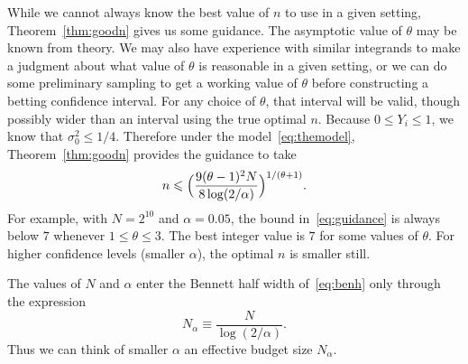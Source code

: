 \documentclass{article}
\newcommand{\art}[1]{\begingroup\color{blue}#1\endgroup}
\renewcommand{\le}{\leqslant}
\begin{document}
\art{While we cannot always know the best value of $n$ to use
in a given setting, Theorem~\ref{thm:goodn} gives us some guidance.
The asymptotic value of $\theta$ may be known from theory.
We may also have experience with similar integrands to make a
judgment about what value of $\theta$ is reasonable in a given
setting, or we can do some preliminary sampling to get a working
value of $\theta$ before constructing a betting confidence interval.
For any choice of $\theta$, that interval will be valid, though possibly 
wider than an interval using the true optimal $n$.
Because $0\le Y_i\le1$, we know that $\sigma_0^2\le 1/4$. Therefore
under the model~\eqref{eq:themodel}, Theorem~\ref{thm:goodn}
provides the guidance to take
\begin{align}\label{eq:guidance}
n\le \Bigl(\frac{9(\theta-1)^2N}{8\log(2/\alpha)}\Bigr)^{1/(\theta+1)}.
\end{align}
For example, with $N=2^{10}$ and $\alpha=0.05$, the bound in~\eqref{eq:guidance}
is always below $7$ whenever $1\le\theta\le3$. The best integer
value is $7$ for some values of $\theta$.
For higher confidence levels (smaller $\alpha$), the optimal
$n$ is smaller still.
}

\art{The values of $N$ and $\alpha$ enter the Bennett half width
of~\eqref{eq:benh} only through  the expression 
$$N_\alpha\equiv \frac{N}{\log(2/\alpha)}.$$ 
Thus
we can think of smaller $\alpha$ 
an effective budget size $N_\alpha$.  
}
\end{document}
